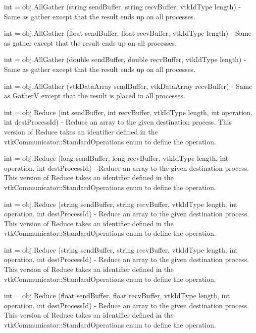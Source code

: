 \begin{DoxyItemize}
\item {\ttfamily int = obj.\-All\-Gather (string send\-Buffer, string recv\-Buffer, vtk\-Id\-Type length)} -\/ Same as gather except that the result ends up on all processes.  
\item {\ttfamily int = obj.\-All\-Gather (float send\-Buffer, float recv\-Buffer, vtk\-Id\-Type length)} -\/ Same as gather except that the result ends up on all processes.  
\item {\ttfamily int = obj.\-All\-Gather (double send\-Buffer, double recv\-Buffer, vtk\-Id\-Type length)} -\/ Same as gather except that the result ends up on all processes.  
\item {\ttfamily int = obj.\-All\-Gather (vtk\-Data\-Array send\-Buffer, vtk\-Data\-Array recv\-Buffer)} -\/ Same as Gather\-V except that the result is placed in all processes.  
\item {\ttfamily int = obj.\-Reduce (int send\-Buffer, int recv\-Buffer, vtk\-Id\-Type length, int operation, int dest\-Process\-Id)} -\/ Reduce an array to the given destination process. This version of Reduce takes an identifier defined in the vtk\-Communicator\-::\-Standard\-Operations enum to define the operation.  
\item {\ttfamily int = obj.\-Reduce (long send\-Buffer, long recv\-Buffer, vtk\-Id\-Type length, int operation, int dest\-Process\-Id)} -\/ Reduce an array to the given destination process. This version of Reduce takes an identifier defined in the vtk\-Communicator\-::\-Standard\-Operations enum to define the operation.  
\item {\ttfamily int = obj.\-Reduce (string send\-Buffer, string recv\-Buffer, vtk\-Id\-Type length, int operation, int dest\-Process\-Id)} -\/ Reduce an array to the given destination process. This version of Reduce takes an identifier defined in the vtk\-Communicator\-::\-Standard\-Operations enum to define the operation.  
\item {\ttfamily int = obj.\-Reduce (string send\-Buffer, string recv\-Buffer, vtk\-Id\-Type length, int operation, int dest\-Process\-Id)} -\/ Reduce an array to the given destination process. This version of Reduce takes an identifier defined in the vtk\-Communicator\-::\-Standard\-Operations enum to define the operation.  
\item {\ttfamily int = obj.\-Reduce (float send\-Buffer, float recv\-Buffer, vtk\-Id\-Type length, int operation, int dest\-Process\-Id)} -\/ Reduce an array to the given destination process. This version of Reduce takes an identifier defined in the vtk\-Communicator\-::\-Standard\-Operations enum to define the operation.  

\end{DoxyItemize}
